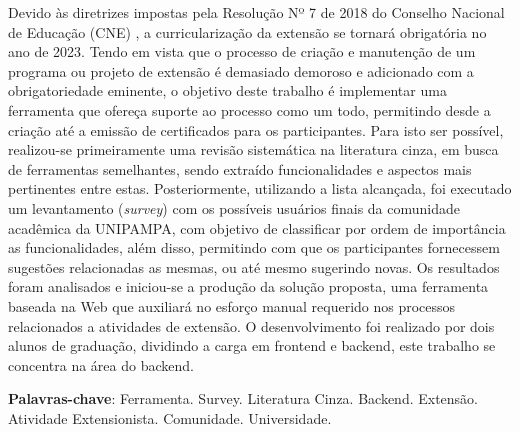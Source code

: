 \begin{resumo}

Devido às diretrizes impostas pela Resolução Nº 7 de 2018 do Conselho Nacional de Educação (CNE) \cite{Resolucao-MEC:2018}, a curricularização da extensão se tornará obrigatória no ano de 2023. 
Tendo em vista que o processo de criação e manutenção de um programa ou projeto de extensão é demasiado demoroso e adicionado com a obrigatoriedade eminente, o objetivo deste trabalho é implementar uma ferramenta que ofereça suporte ao processo como um todo, permitindo desde a criação até a emissão de certificados para os participantes. 
Para isto ser possível, realizou-se primeiramente uma revisão sistemática na literatura cinza, em busca de ferramentas semelhantes, sendo extraído funcionalidades e aspectos mais pertinentes entre estas. 
Posteriormente, utilizando a lista alcançada, foi executado um levantamento (\textit{survey}) com os possíveis usuários finais da comunidade acadêmica da UNIPAMPA, com objetivo de classificar por ordem de importância as funcionalidades, além disso, permitindo com que os participantes fornecessem sugestões relacionadas as mesmas, ou até mesmo sugerindo novas. 
Os resultados foram analisados e iniciou-se a produção da solução proposta, uma ferramenta baseada na Web que auxiliará no esforço manual requerido nos processos relacionados a atividades de extensão. 
O desenvolvimento foi realizado por dois alunos de graduação, dividindo a carga em frontend e backend, este trabalho se concentra na área do backend.

\vspace{\onelineskip}
    
\noindent
\textbf{Palavras-chave}: Ferramenta. Survey. Literatura Cinza. Backend. Extensão. Atividade Extensionista. Comunidade. Universidade.

\end{resumo}
